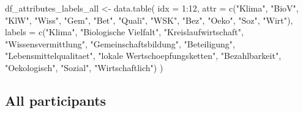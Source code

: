 \documentclass[
]{article}
\newenvironment{Shaded}{\begin{snugshade}}{\end{snugshade}}
\newcommand{\AttributeTok}[1]{\textcolor[rgb]{0.00,0.34,0.68}{#1}}
\newcommand{\DecValTok}[1]{\textcolor[rgb]{0.69,0.50,0.00}{#1}}
\newcommand{\FunctionTok}[1]{\textcolor[rgb]{0.39,0.29,0.61}{#1}}
\newcommand{\NormalTok}[1]{\textcolor[rgb]{0.12,0.11,0.11}{#1}}
\newcommand{\OtherTok}[1]{\textcolor[rgb]{0.00,0.43,0.16}{#1}}
\newcommand{\SpecialCharTok}[1]{\textcolor[rgb]{0.24,0.68,0.91}{#1}}
\newcommand{\StringTok}[1]{\textcolor[rgb]{0.75,0.01,0.01}{#1}}
\begin{document}
\begin{Shaded}
\begin{Highlighting}[]
\NormalTok{df\_attributes\_labels\_all }\OtherTok{\textless{}{-}} \FunctionTok{data.table}\NormalTok{(}
  \AttributeTok{idx =} \DecValTok{1}\SpecialCharTok{:}\DecValTok{12}\NormalTok{,}
  \AttributeTok{attr =} \FunctionTok{c}\NormalTok{(}\StringTok{"Klima"}\NormalTok{, }\StringTok{"BioV"}\NormalTok{, }\StringTok{"KlW"}\NormalTok{,}
           \StringTok{"Wiss"}\NormalTok{, }\StringTok{"Gem"}\NormalTok{, }\StringTok{"Bet"}\NormalTok{,}
           \StringTok{"Quali"}\NormalTok{, }\StringTok{"WSK"}\NormalTok{, }\StringTok{"Bez"}\NormalTok{,}
           \StringTok{"Oeko"}\NormalTok{, }\StringTok{"Soz"}\NormalTok{, }\StringTok{"Wirt"}\NormalTok{),}
  \AttributeTok{labels =} \FunctionTok{c}\NormalTok{(}\StringTok{"Klima"}\NormalTok{, }\StringTok{"Biologische Vielfalt"}\NormalTok{, }\StringTok{"Kreislaufwirtschaft"}\NormalTok{,}
             \StringTok{"Wissensvermittlung"}\NormalTok{, }\StringTok{"Gemeinschaftsbildung"}\NormalTok{, }\StringTok{"Beteiligung"}\NormalTok{,}
             \StringTok{"Lebensmittelqualitaet"}\NormalTok{, }\StringTok{"lokale Wertschoepfungsketten"}\NormalTok{, }\StringTok{"Bezahlbarkeit"}\NormalTok{,}
             \StringTok{"Oekologisch"}\NormalTok{, }\StringTok{"Sozial"}\NormalTok{, }\StringTok{"Wirtschaftlich"}\NormalTok{)}
\NormalTok{)}
\end{Highlighting}
\end{Shaded}

\hypertarget{all-participants}{%
\subsection{All participants}\label{all-participants}}
\end{document}
